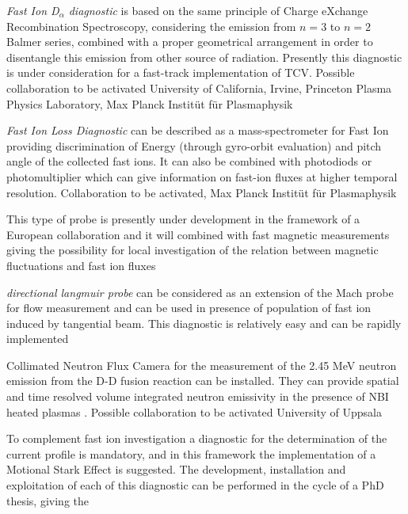 \documentclass[12pt,a4paper]{article}
\begin{document}
\begin{description}[labelindent=0pt, labelsep*=0.4em, leftmargin=!, itemsep=0.02ex]
\item[FIDA:] \emph{Fast Ion D$_{\alpha}$ diagnostic} is based on the
  same principle of Charge eXchange Recombination Spectroscopy,
  considering the emission from $n=3$ to $n=2$ Balmer series, combined
  with a proper geometrical arrangement in order to disentangle this
  emission from other source of radiation. Presently this diagnostic
  is under consideration for a fast-track implementation of
  TCV. Possible collaboration to be activated University of
  California, Irvine, Princeton Plasma Physics Laboratory, Max Planck Instit{\"u}t f{\"u}r Plasmaphysik
\item[FILD:] \emph{Fast Ion Loss Diagnostic} can be described as a
  mass-spectrometer for Fast Ion providing discrimination of Energy
  (through gyro-orbit evaluation) and pitch angle of the collected
  fast ions. It can also be combined with photodiods or
  photomultiplier which can give information on fast-ion fluxes at
  higher temporal resolution. Collaboration to be activated, Max
  Planck Instit{\"u}t f{\"u}r Plasmaphysik
\item[Ion Energy Analyzer probe:] This type of probe is presently
  under development in the framework of a European collaboration and
  it will combined with fast magnetic measurements giving the
  possibility for local investigation of the relation between magnetic
  fluctuations and fast ion fluxes
\item[DLP:] \emph{directional langmuir probe} can be considered as an
  extension of the Mach probe for flow measurement and can be used in
  presence of population of fast ion induced by tangential beam. This
  diagnostic is relatively easy and can be rapidly implemented
\item[Neutron Camera:] Collimated Neutron Flux Camera for the
  measurement of the 2.45 MeV neutron emission from the D-D fusion
  reaction can be installed. They can provide spatial and time
  resolved volume integrated neutron emissivity in the presence of NBI
  heated plasmas \cite{Cecconello:2014hw}. Possible collaboration to be activated
  University of Uppsala
\end{description}
To complement fast ion investigation a diagnostic for the
determination of the current profile is mandatory, and in this
framework the implementation of a Motional Stark Effect is suggested.
The development, installation and exploitation of each of this
diagnostic can be performed in the cycle of a PhD thesis, giving the
\end{document}
